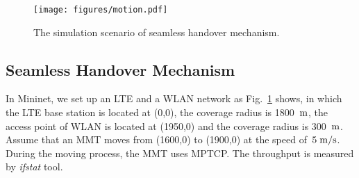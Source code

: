 \documentclass[conference]{IEEEtran}
\begin{document}
\begin{comment}
we simulate 1000 times network variation for a MMT to execute network selection algorithm.
We compared our proposed algorithm with MMT network selection algorithm in ~\cite{MCGDM} and RSS based algorithm. The result is shown as
follows.     Fig\ref{fig:selectedprob}.


From Fig\ref{fig:selectedprob} we can see that proposed algorithm ......
  
 
Then to show the efficiency in handover number of proposed algorithm  
\end{comment}
 \begin{figure}[htbp!]
 	\centering
 	\texttt{[image: figures/motion.pdf]}
 	\caption{The simulation scenario of seamless handover mechanism.}\label{fig:LTE-WLAN}
 	\vspace{-1em}
 \end{figure}
 

 
\subsection{Seamless Handover Mechanism}

In Mininet, we set up an LTE and a WLAN network as Fig.~\ref{fig:LTE-WLAN} shows, in which the LTE base station is located at (0,0), the coverage radius is 1800~$\rm m$, the access point of WLAN is located at (1950,0) and the coverage radius is 300~$\rm m$.
Assume that an MMT moves from (1600,0) to (1900,0) at the speed of~$5\;\rm m/s$. During the moving process, the MMT uses MPTCP. 
The throughput is measured by {\it ifstat} tool. 
\end{document}
